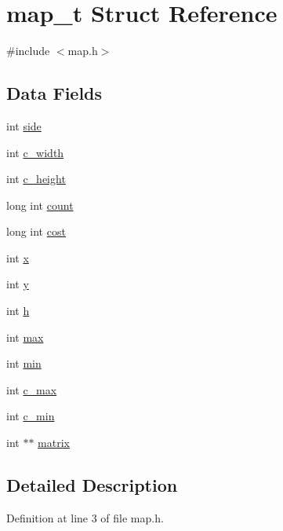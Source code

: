 \hypertarget{structmap__t}{\section{map\-\_\-t Struct Reference}
\label{structmap__t}
}


{\ttfamily \#include $<$map.\-h$>$}

\subsection*{Data Fields}
\begin{DoxyCompactItemize}
\item 
int \hyperlink{structmap__t_a2d7431eddd5ca6d1ac206533ee0bad0e}{side}
\item 
int \hyperlink{structmap__t_af756930ecb58336c993cf9a50e64d5fd}{c\-\_\-width}
\item 
int \hyperlink{structmap__t_a2aa8ffa89bb8f194715ce066b1765a98}{c\-\_\-height}
\item 
long int \hyperlink{structmap__t_aabbb2f7768ed83b49f05e7911e3a693a}{count}
\item 
long int \hyperlink{structmap__t_a9f2dafabe0c6f59d1b086dda0c1dd0d6}{cost}
\item 
int \hyperlink{structmap__t_a6150e0515f7202e2fb518f7206ed97dc}{x}
\item 
int \hyperlink{structmap__t_a0a2f84ed7838f07779ae24c5a9086d33}{y}
\item 
int \hyperlink{structmap__t_a16611451551e3d15916bae723c3f59f7}{h}
\item 
int \hyperlink{structmap__t_ae1e1dde676c120fa6d10f3bb2c14059e}{max}
\item 
int \hyperlink{structmap__t_a3e202b201e6255d975cd6d3aff1f5a4d}{min}
\item 
int \hyperlink{structmap__t_ad9249b2bdb316c332e2d908dda59be80}{c\-\_\-max}
\item 
int \hyperlink{structmap__t_a34595983613ed34306b3d58f311978e4}{c\-\_\-min}
\item 
int $\ast$$\ast$ \hyperlink{structmap__t_ac29a4fcfe6e2fb5a94cb5350ac977ce4}{matrix}
\end{DoxyCompactItemize}


\subsection{Detailed Description}


Definition at line 3 of file map.\-h.



